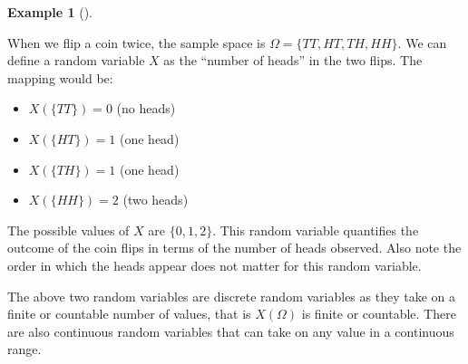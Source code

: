 \documentclass[
  letterpaper,
  DIV=11,
  numbers=noendperiod]{scrreport}
\providecommand{\tightlist}{%
  \setlength{\itemsep}{0pt}\setlength{\parskip}{0pt}}
\theoremstyle{definition}
\newtheorem{example}{Example}[chapter]
\theoremstyle{plain}
\theoremstyle{plain}
\theoremstyle{definition}
\theoremstyle{remark}
\begin{document}
\begin{tcolorbox}[enhanced jigsaw, opacitybacktitle=0.6, bottomtitle=1mm, opacityback=0, toprule=.15mm, colbacktitle=quarto-callout-note-color!10!white, colback=white, left=2mm, title={Random variable: Number of heads in two coin flips}, breakable, rightrule=.15mm, leftrule=.75mm, titlerule=0mm, colframe=quarto-callout-note-color-frame, arc=.35mm, coltitle=black, toptitle=1mm, bottomrule=.15mm]

\begin{example}[]\protect\hypertarget{exm-random-variable-heads}{}\label{exm-random-variable-heads}

When we flip a coin twice, the sample space is
\(\Omega = \{TT, HT, TH, HH\}\). We can define a random variable \(X\)
as the ``number of heads'' in the two flips. The mapping would be:

\begin{itemize}
\tightlist
\item
  \(X(\{TT\}) = 0\) (no heads)
\item
  \(X(\{HT\}) = 1\) (one head)
\item
  \(X(\{TH\}) = 1\) (one head)
\item
  \(X(\{HH\}) = 2\) (two heads)
\end{itemize}

The possible values of \(X\) are \(\{0, 1, 2\}\). This random variable
quantifies the outcome of the coin flips in terms of the number of heads
observed. Also note the order in which the heads appear does not matter
for this random variable.

\end{example}

\end{tcolorbox}

The above two random variables are discrete random variables as they
take on a finite or countable number of values, that is \(X(\Omega)\) is
finite or countable. There are also continuous random variables that can
take on any value in a continuous range.
\end{document}
